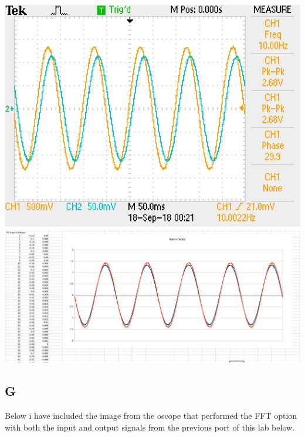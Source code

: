 \documentclass[12pt]{article}
\begin{document}
				\begin{center}
					\includegraphics[scale=0.6]{input.jpg}\\
					\vspace{1cm}
					\includegraphics[scale=0.15]{einput.png}
				\end{center}

		\subsection{G}
			Below i have included the image from the oscope that performed the FFT option with both the input and output signals from the previous port of
			this lab below.
			
\end{document}
